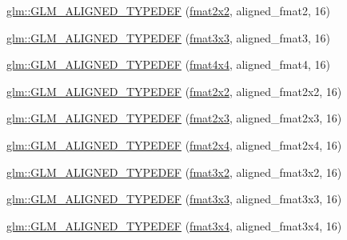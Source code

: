 \begin{DoxyCompactItemize}
\item 
\hyperlink{group__gtx__type__aligned_ga719da577361541a4c43a2dd1d0e361e1}{glm\+::\+G\+L\+M\+\_\+\+A\+L\+I\+G\+N\+E\+D\+\_\+\+T\+Y\+P\+E\+D\+EF} (\hyperlink{group__gtc__type__precision_ga20fdbcc6b16bed27ad25db9b71d09e93}{fmat2x2}, aligned\+\_\+fmat2, 16)
\item 
\hyperlink{group__gtx__type__aligned_ga6e7ee4f541e1d7db66cd1a224caacafb}{glm\+::\+G\+L\+M\+\_\+\+A\+L\+I\+G\+N\+E\+D\+\_\+\+T\+Y\+P\+E\+D\+EF} (\hyperlink{group__gtc__type__precision_ga577209f19554f5291cc3d66dda9a4388}{fmat3x3}, aligned\+\_\+fmat3, 16)
\item 
\hyperlink{group__gtx__type__aligned_gae5d672d359f2a39f63f98c7975057486}{glm\+::\+G\+L\+M\+\_\+\+A\+L\+I\+G\+N\+E\+D\+\_\+\+T\+Y\+P\+E\+D\+EF} (\hyperlink{group__gtc__type__precision_ga16b508b75c7213ba6b24055ff3b7503d}{fmat4x4}, aligned\+\_\+fmat4, 16)
\item 
\hyperlink{group__gtx__type__aligned_ga6fa2df037dbfc5fe8c8e0b4db8a34953}{glm\+::\+G\+L\+M\+\_\+\+A\+L\+I\+G\+N\+E\+D\+\_\+\+T\+Y\+P\+E\+D\+EF} (\hyperlink{group__gtc__type__precision_ga20fdbcc6b16bed27ad25db9b71d09e93}{fmat2x2}, aligned\+\_\+fmat2x2, 16)
\item 
\hyperlink{group__gtx__type__aligned_ga0743b4f4f69a3227b82ff58f6abbad62}{glm\+::\+G\+L\+M\+\_\+\+A\+L\+I\+G\+N\+E\+D\+\_\+\+T\+Y\+P\+E\+D\+EF} (\hyperlink{group__gtc__type__precision_ga80f463bcb7e5008c11af5fdbc52c0045}{fmat2x3}, aligned\+\_\+fmat2x3, 16)
\item 
\hyperlink{group__gtx__type__aligned_ga1a76b325fdf70f961d835edd182c63dd}{glm\+::\+G\+L\+M\+\_\+\+A\+L\+I\+G\+N\+E\+D\+\_\+\+T\+Y\+P\+E\+D\+EF} (\hyperlink{group__gtc__type__precision_ga76578ee3c2d6de9b46d0efd1c7060b85}{fmat2x4}, aligned\+\_\+fmat2x4, 16)
\item 
\hyperlink{group__gtx__type__aligned_ga4b4e181cd041ba28c3163e7b8074aef0}{glm\+::\+G\+L\+M\+\_\+\+A\+L\+I\+G\+N\+E\+D\+\_\+\+T\+Y\+P\+E\+D\+EF} (\hyperlink{group__gtc__type__precision_gab194ac1a68dbcb228384112ebe531c67}{fmat3x2}, aligned\+\_\+fmat3x2, 16)
\item 
\hyperlink{group__gtx__type__aligned_ga27b13f465abc8a40705698145e222c3f}{glm\+::\+G\+L\+M\+\_\+\+A\+L\+I\+G\+N\+E\+D\+\_\+\+T\+Y\+P\+E\+D\+EF} (\hyperlink{group__gtc__type__precision_ga577209f19554f5291cc3d66dda9a4388}{fmat3x3}, aligned\+\_\+fmat3x3, 16)
\item 
\hyperlink{group__gtx__type__aligned_ga2608d19cc275830a6f8c0b6405625a4f}{glm\+::\+G\+L\+M\+\_\+\+A\+L\+I\+G\+N\+E\+D\+\_\+\+T\+Y\+P\+E\+D\+EF} (\hyperlink{group__gtc__type__precision_gad68d9daa91ef05b29e80e044931837cf}{fmat3x4}, aligned\+\_\+fmat3x4, 16)

\end{DoxyCompactItemize}
